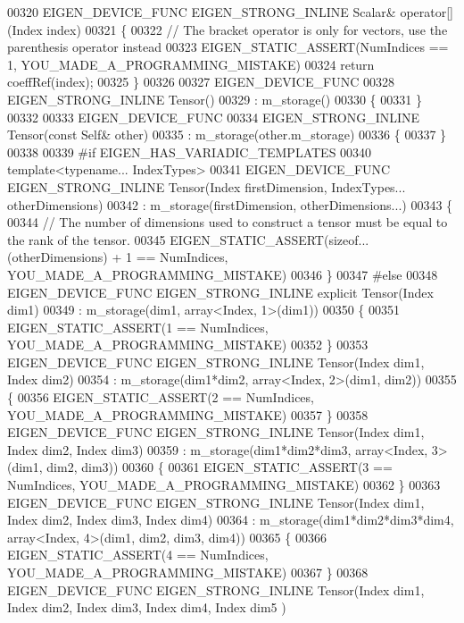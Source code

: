 \begin{DoxyCode}
00320     EIGEN\_DEVICE\_FUNC EIGEN\_STRONG\_INLINE Scalar& operator[](Index index)
00321     \{
00322       \textcolor{comment}{// The bracket operator is only for vectors, use the parenthesis operator instead}
00323       EIGEN\_STATIC\_ASSERT(NumIndices == 1, YOU\_MADE\_A\_PROGRAMMING\_MISTAKE)
00324       \textcolor{keywordflow}{return} coeffRef(index);
00325     \}
00326 
00327     EIGEN\_DEVICE\_FUNC
00328     EIGEN\_STRONG\_INLINE Tensor()
00329       : m\_storage()
00330     \{
00331     \}
00332 
00333     EIGEN\_DEVICE\_FUNC
00334     EIGEN\_STRONG\_INLINE Tensor(\textcolor{keyword}{const} Self& other)
00335       : m\_storage(other.m\_storage)
00336     \{
00337     \}
00338 
00339 \textcolor{preprocessor}{#if EIGEN\_HAS\_VARIADIC\_TEMPLATES}
00340     \textcolor{keyword}{template}<\textcolor{keyword}{typename}... IndexTypes>
00341     EIGEN\_DEVICE\_FUNC EIGEN\_STRONG\_INLINE Tensor(Index firstDimension, IndexTypes... otherDimensions)
00342         : m\_storage(firstDimension, otherDimensions...)
00343     \{
00344       \textcolor{comment}{// The number of dimensions used to construct a tensor must be equal to the rank of the tensor.}
00345       EIGEN\_STATIC\_ASSERT(\textcolor{keyword}{sizeof}...(otherDimensions) + 1 == NumIndices, YOU\_MADE\_A\_PROGRAMMING\_MISTAKE)
00346     \}
00347 \textcolor{preprocessor}{#else}
00348     EIGEN\_DEVICE\_FUNC EIGEN\_STRONG\_INLINE \textcolor{keyword}{explicit} Tensor(Index dim1)
00349       : m\_storage(dim1, array<Index, 1>(dim1))
00350     \{
00351       EIGEN\_STATIC\_ASSERT(1 == NumIndices, YOU\_MADE\_A\_PROGRAMMING\_MISTAKE)
00352     \}
00353     EIGEN\_DEVICE\_FUNC EIGEN\_STRONG\_INLINE Tensor(Index dim1, Index dim2)
00354       : m\_storage(dim1*dim2, array<Index, 2>(dim1, dim2))
00355     \{
00356       EIGEN\_STATIC\_ASSERT(2 == NumIndices, YOU\_MADE\_A\_PROGRAMMING\_MISTAKE)
00357     \}
00358     EIGEN\_DEVICE\_FUNC EIGEN\_STRONG\_INLINE Tensor(Index dim1, Index dim2, Index dim3)
00359       : m\_storage(dim1*dim2*dim3, array<Index, 3>(dim1, dim2, dim3))
00360     \{
00361       EIGEN\_STATIC\_ASSERT(3 == NumIndices, YOU\_MADE\_A\_PROGRAMMING\_MISTAKE)
00362     \}
00363     EIGEN\_DEVICE\_FUNC EIGEN\_STRONG\_INLINE Tensor(Index dim1, Index dim2, Index dim3, Index dim4)
00364       : m\_storage(dim1*dim2*dim3*dim4, array<Index, 4>(dim1, dim2, dim3, dim4))
00365     \{
00366       EIGEN\_STATIC\_ASSERT(4 == NumIndices, YOU\_MADE\_A\_PROGRAMMING\_MISTAKE)
00367     \}
00368     EIGEN\_DEVICE\_FUNC EIGEN\_STRONG\_INLINE Tensor(Index dim1, Index dim2, Index dim3, Index dim4, Index dim5
      )

\end{DoxyCode}
